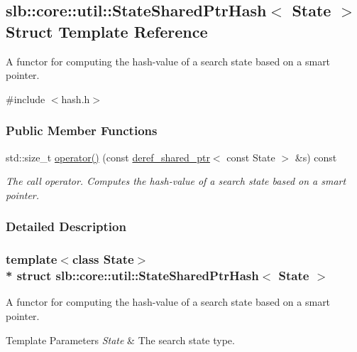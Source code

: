 \hypertarget{structslb_1_1core_1_1util_1_1StateSharedPtrHash}{}\subsection{slb\+:\+:core\+:\+:util\+:\+:State\+Shared\+Ptr\+Hash$<$ State $>$ Struct Template Reference}
\label{structslb_1_1core_1_1util_1_1StateSharedPtrHash}


A functor for computing the hash-\/value of a search state based on a smart pointer.  




{\ttfamily \#include $<$hash.\+h$>$}

\subsubsection*{Public Member Functions}
\begin{DoxyCompactItemize}
\item 
std\+::size\+\_\+t \hyperlink{structslb_1_1core_1_1util_1_1StateSharedPtrHash_ae50f97ae57397f2018e04f60a84e09b1}{operator()} (const \hyperlink{classslb_1_1core_1_1util_1_1deref__shared__ptr}{deref\+\_\+shared\+\_\+ptr}$<$ const State $>$ \&s) const 
\begin{DoxyCompactList}\small\item\em The call operator. Computes the hash-\/value of a search state based on a smart pointer. \end{DoxyCompactList}\end{DoxyCompactItemize}


\subsubsection{Detailed Description}
\subsubsection*{template$<$class State$>$\\*
struct slb\+::core\+::util\+::\+State\+Shared\+Ptr\+Hash$<$ State $>$}

A functor for computing the hash-\/value of a search state based on a smart pointer. 


\begin{DoxyTemplParams}{Template Parameters}
{\em State} & The search state type. \\
\hline
\end{DoxyTemplParams}


